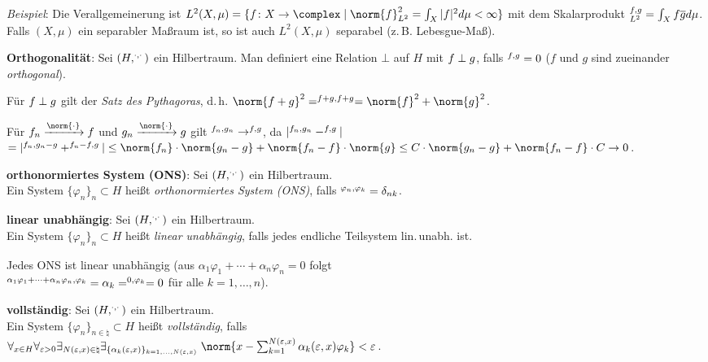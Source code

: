 \emph{Beispiel}:
Die Verallgemeinerung ist $L^2(X, \mu) =
\{f\colon X \rightarrow \complex \;|\;
\norm{f}_{L^2}^2 = \int_X |f|^2 d\mu < \infty\}$ mit dem Skalarprodukt
$\sp{f, g}_{L^2} = \int_X f \overline{g} d\mu$.
Falls $(X, \mu)$ ein separabler Maßraum ist, so ist auch
$L^2(X, \mu)$ separabel (z.\,B. Lebesgue-Maß).

\linie

\textbf{Orthogonalität}:
Sei $(H, \sp{\cdot, \cdot})$ ein Hilbertraum.
Man definiert eine Relation $\bot$ auf $H$ mit
$f \;\bot\; g$, falls $\sp{f, g} = 0$
($f$ und $g$ sind zueinander \emph{orthogonal}).

Für $f \;\bot\; g$ gilt der \emph{Satz des Pythagoras}, d.\,h.
$\norm{f + g}^2 = \sp{f + g, f + g} = \norm{f}^2 + \norm{g}^2$.

Für $f_n \xrightarrow{\norm{\cdot}} f$ und $g_n \xrightarrow{\norm{\cdot}} g$
gilt $\sp{f_n, g_n} \to \sp{f, g}$, da
$|\sp{f_n, g_n} - \sp{f, g}|$\\
$= |\sp{f_n, g_n - g} + \sp{f_n - f, g}| \le
\norm{f_n} \cdot \norm{g_n - g} + \norm{f_n - f} \cdot \norm{g}
\le C \cdot \norm{g_n - g} + \norm{f_n - f} \cdot C \to 0$.

\linie

\textbf{orthonormiertes System (ONS)}:
Sei $(H, \sp{\cdot, \cdot})$ ein Hilbertraum.\\
Ein System $\{\varphi_n\}_n \subset H$ heißt
\emph{orthonormiertes System (ONS)}, falls
$\sp{\varphi_n, \varphi_k} = \delta_{nk}$.

\textbf{linear unabhängig}:
Sei $(H, \sp{\cdot, \cdot})$ ein Hilbertraum.\\
Ein System $\{\varphi_n\}_n \subset H$ heißt
\emph{linear unabhängig}, falls jedes endliche Teilsystem lin.\,unabh. ist.

Jedes ONS ist linear unabhängig
(aus $\alpha_1 \varphi_1 + \dotsb + \alpha_n \varphi_n = 0$ folgt\\
$\sp{\alpha_1 \varphi_1 + \dotsb + \alpha_n \varphi_n, \varphi_k}
= \alpha_k = \sp{0, \varphi_k} = 0$ für alle $k = 1, \dotsc, n$).

\textbf{vollständig}:
Sei $(H, \sp{\cdot, \cdot})$ ein Hilbertraum.\\
Ein System $\{\varphi_n\}_{n \in \natural} \subset H$ heißt
\emph{vollständig}, falls\\
$\forall_{x \in H} \forall_{\varepsilon > 0}
\exists_{N(\varepsilon, x) \in \natural}
\exists_{\{\alpha_k(\varepsilon, x)\}_{k=1,\dotsc,N(\varepsilon,x)}}\;
\norm{x - \sum_{k=1}^{N(\varepsilon,x)} \alpha_k(\varepsilon, x) \varphi_k}
< \varepsilon$.

